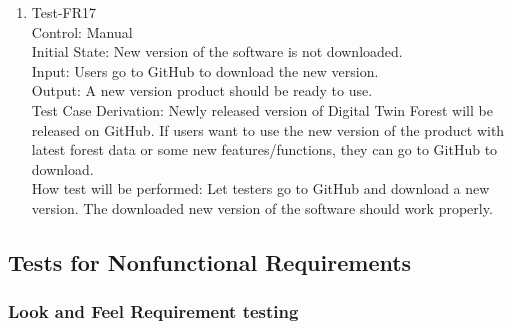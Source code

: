 \documentclass[12pt, titlepage]{article}
\begin{document}
\begin{enumerate}
\item{Test-FR17\\}
Control: Manual\\ 

Initial State: New version of the software is not downloaded.\\

Input: Users go to GitHub to download the new version.\\

Output: A new version product should be ready to use.\\

Test Case Derivation: Newly released version of Digital Twin Forest will be released
on GitHub. If users want to use the new version of the product with latest forest data
or some new features/functions, they can go to GitHub to download.\\
					
How test will be performed:  Let testers go to GitHub and download a new version.
The downloaded new version of the software should work properly.
\end{enumerate}


\subsection{Tests for Nonfunctional Requirements}

\subsubsection{Look and Feel Requirement testing}
\end{document}
